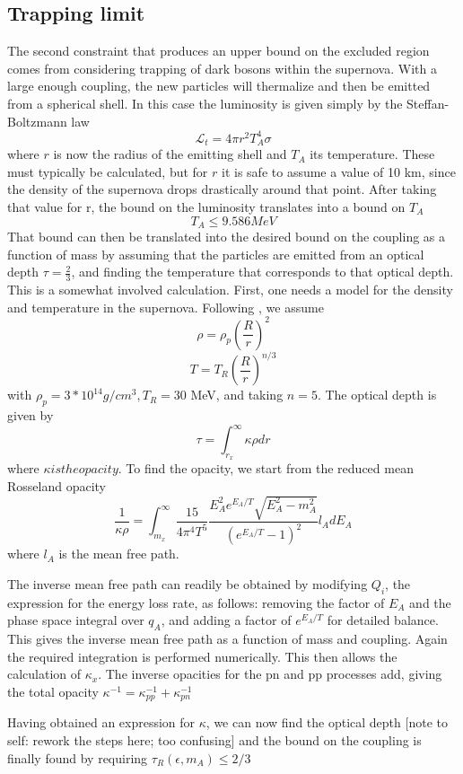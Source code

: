 \documentclass[10pt,a4paper]{article}
\begin{document}
	
	\subsection{Trapping limit}
	The second constraint that produces an upper bound on the excluded region comes from considering trapping of dark bosons within the supernova. With a large enough coupling, the new particles will thermalize and then be emitted from a spherical shell. In this case the luminosity is given simply by the Steffan-Boltzmann law
	\[ \mathcal{L}_t  = 4\pi r^2 T_A^4 \sigma\]
	where $ r $ is now the radius of the emitting shell and $ T_A $ its temperature. These must typically be calculated, but for $ r $ it is safe to assume a value of 10 km, since the density of the supernova drops drastically around that point. After taking that value for r, the bound on the luminosity translates into a bound on $ T_A $ \[ T_A \le 9.586 MeV \] That bound can then be translated into the desired bound on the coupling as a function of mass by assuming that the particles are emitted from an optical depth $ \tau = \frac{2}{3} $, and finding the temperature that corresponds to that optical depth. This is a somewhat involved calculation.
	First, one needs a model for the density and temperature in the supernova. Following \cite{dent}, we assume \[ \rho = \rho_p (\frac{R}{r})^2 \] \[ T = T_R (\frac{R}{r})^{n/3} \]
	with $  \rho_p  = 3*10^{14} g/cm^3, T_R = 30$ MeV, and taking $ n = 5 $. The optical depth is given by \[ \tau = \int_{r_x}^{\infty} \kappa \rho dr \]where $ \kappa is the opacity $. 
	To find the opacity, we start from the reduced mean Rosseland opacity \[ \frac{1}{\kappa \rho} = \int_{m_x}^{\infty} \frac{15}{4 \pi^4 T^5} \frac{E_A^2 e^{E_A/T} \sqrt{E_A^2 - m_A^2}}{(e^{E_A/T}-1)^2} l_A dE_A \]where $ l_A $ is the mean free path. 
	
	The inverse mean free path can readily be obtained by modifying $ Q_i $, the expression for the energy loss rate, as follows: removing the factor of $ E_A $ and the phase space integral over $ q_A $, and adding a factor of $ e^{E_A/T} $ for detailed balance. This gives the inverse mean free path as a function of mass and coupling. Again the required integration is performed numerically. This then allows the calculation of $ \kappa_x $. The inverse opacities for the pn and pp processes add, giving the total opacity $ \kappa^{-1} = \kappa_{pp}^{-1} + \kappa_{pn}^{-1} $
	
	Having obtained an expression for $ \kappa $, we can now find the optical depth
	[note to self: rework the steps here; too confusing]
	and the bound on the coupling is finally found by requiring  $ \tau_R(\epsilon,m_A) \le 2/3 $
	
\end{document}
